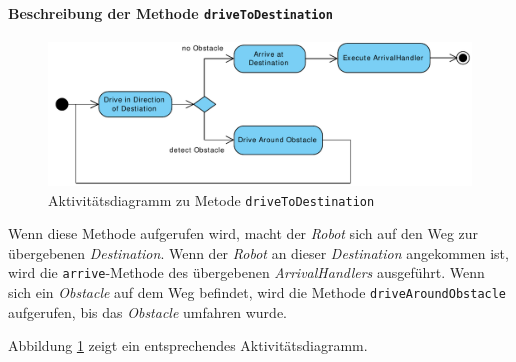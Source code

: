 			\paragraph{Beschreibung der Methode \texttt{driveToDestination}}
			\begin{figure}[H]
			\centering
			\includegraphics[width=1\textwidth]{img/1-Entwurf-7-1-methode_driveAroundObstacle}
			\caption{Aktivitätsdiagramm zu Metode \texttt{driveToDestination}}
			\label{AktivitaetDriveToDestination}
			\end{figure}

			Wenn diese Methode aufgerufen wird, macht der \textit{Robot} sich auf den Weg zur 
			übergebenen \textit{Destination}. Wenn der \textit{Robot} an dieser \textit{Destination} 
			angekommen ist, wird die \texttt{arrive}-Methode des übergebenen \textit{ArrivalHandlers} ausgeführt. 
			Wenn sich ein \textit{Obstacle} auf dem Weg befindet, wird die Methode \texttt{driveAroundObstacle} 
			aufgerufen, bis das \textit{Obstacle} umfahren wurde.
			
			Abbildung \ref{AktivitaetDriveToDestination} zeigt ein entsprechendes Aktivitätsdiagramm.

